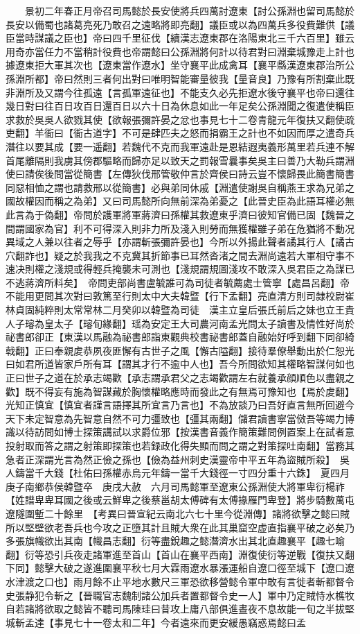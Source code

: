 　　景初二年春正月帝召司馬懿於長安使將兵四萬討遼東【討公孫淵也留司馬懿於長安以備蜀也諸葛亮死乃敢召之遠略將即亮翻】議臣或以為四萬兵多役費難供【議臣當時謀議之臣也】帝曰四千里征伐【續漢志遼東郡在洛陽東北三千六百里】雖云用奇亦當任力不當稍計役費也帝謂懿曰公孫淵將何計以待君對曰淵棄城豫走上計也據遼東拒大軍其次也【遼東當作遼水】坐守襄平此成禽耳【襄平縣漢遼東郡治所公孫淵所都】帝曰然則三者何出對曰唯明智能審量彼我【量音良】乃豫有所割棄此既非淵所及又謂今往孤遠【言孤軍遠征也】不能支久必先拒遼水後守襄平也帝曰還往幾日對曰往百日攻百日還百日以六十日為休息如此一年足矣公孫淵聞之復遣使稱臣求救於吳吳人欲戮其使【欲報張彌許晏之忿也事見七十二卷青龍元年復扶又翻使疏吏翻】羊衜曰【衜古道字】不可是肆匹夫之怒而捐霸王之計也不如因而厚之遣奇兵潛往以要其成【要一遥翻】若魏代不克而我軍遠赴是恩結遐夷義形萬里若兵連不解首尾離隔則我虜其傍郡驅略而歸亦足以致天之罰報雪曩事矣吳主曰善乃大勒兵謂淵使曰請俟後問當從簡書【左傳狄伐邢管敬仲言於齊侯曰詩云豈不懷歸畏此簡書簡書同惡相恤之謂也請救邢以從簡書】必與弟同休戚【淵遣使謝吳自稱燕王求為兄弟之國故權因而稱之為弟】又曰司馬懿所向無前深為弟憂之【此晉史臣為此語耳權必無此言為于偽翻】帝問於護軍將軍蔣濟曰孫權其救遼東乎濟曰彼知官備已固【魏晉之間謂國家為官】利不可得深入則非力所及淺入則勞而無獲權雖子弟在危猶將不動况異域之人兼以往者之辱乎【亦謂斬張彌許晏也】今所以外揚此聲者譎其行人【譎古穴翻詐也】疑之於我我之不克冀其折節事已耳然沓渚之間去淵尚遠若大軍相守事不速决則權之淺規或得輕兵掩襲未可測也【淺規謂規圖淺攻不敢深入吳君臣之為謀已不逃蔣濟所料矣】　帝問吏部尚書盧毓誰可為司徒者毓薦處士管寧【處昌呂翻】帝不能用更問其次對曰敦篤至行則太中大夫韓暨【行下孟翻】亮直清方則司隸校尉崔林貞固純粹則太常常林二月癸卯以韓暨為司徒　漢主立皇后張氏前后之妹也立王貴人子璿為皇太子【璿旬緣翻】瑶為安定王大司農河南孟光問太子讀書及情性好尚於祕書郎卻正【東漢以馬融為祕書郎詣東觀典校書祕書郎蓋自融始好呼到翻下同卻綺戟翻】正曰奉親䖍恭夙夜匪懈有古世子之風【懈古隘翻】接待羣僚舉動出於仁恕光曰如君所道皆家戶所有耳【謂其才行不逾中人也】吾今所問欲知其權略智謀何如也正曰世子之道在於承志竭歡【承志謂承君父之志竭歡謂左右就養承顔順色以盡親之歡】既不得妄有施為智謀藏於胸懷權略應時而發此之有無焉可豫知也【焉於䖍翻】光知正慎宜【慎宜者謹言語擇其所宜言乃言也】不為放談乃曰吾好直言無所回避今天下未定智意為先智意自然不可力彊致也【彊其兩翻】儲君讀書寧當傚吾等竭力博識以待訪問如博士探策講試以求爵位邪【按漢書音義作簡策難問例置案上在試者意投射取而答之謂之射策即探策也若録政化得失顯而問之謂之對策探吐南翻】當務其急者正深謂光言為然正儉之孫也【儉為益州刺史漢靈帝中平五年為盜賊所殺】　吳人鑄當千大錢【杜佑曰孫權赤烏元年鑄一當千大錢徑一寸四分重十六銖】　夏四月庚子南鄉恭侯韓暨卒　庚戌大赦　六月司馬懿軍至遼東公孫淵使大將軍卑衍楊祚【姓譜卑卑耳國之後或云鮮卑之後蔡邕胡太傅碑有太傅掾雁門卑登】將步騎數萬屯遼隧圍塹二十餘里　【考異曰晉宣紀云南北六七十里今從淵傳】諸將欲擊之懿曰賊所以堅壁欲老吾兵也今攻之正墮其計且賊大衆在此其巢窟空虚直指襄平破之必矣乃多張旗幟欲出其南【幟昌志翻】衍等盡銳趣之懿潛濟水出其北直趣襄平【趣七喻翻】衍等恐引兵夜走諸軍進至首山【首山在襄平西南】淵復使衍等逆戰【復扶又翻下同】懿擊大破之遂進圍襄平秋七月大霖雨遼水暴漲運船自遼口徑至城下【遼口遼水津渡之口也】雨月餘不止平地水數尺三軍恐欲移營懿令軍中敢有言徙者斬都督令史張静犯令斬之【晉職官志魏制諸公加兵者置都督令史一人】軍中乃定賊恃水樵牧自若諸將欲取之懿皆不聽司馬陳珪曰昔攻上庸八部俱進晝夜不息故能一旬之半拔堅城斬孟達【事見七十一卷太和二年】今者遠來而更安緩愚竊惑焉懿曰孟